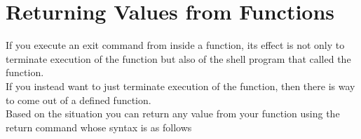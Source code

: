 \documentclass{article}
\begin{document}
\section*{Returning Values from Functions}
If you execute an exit command from inside a function, its effect is not only to terminate execution of the function but also of the shell program that called the function.\\
If you instead want to just terminate execution of the function, then there is way to come out of a defined function.\\
Based on the situation you can return any value from your function using the return command whose syntax is as follows \\

\end{document}
